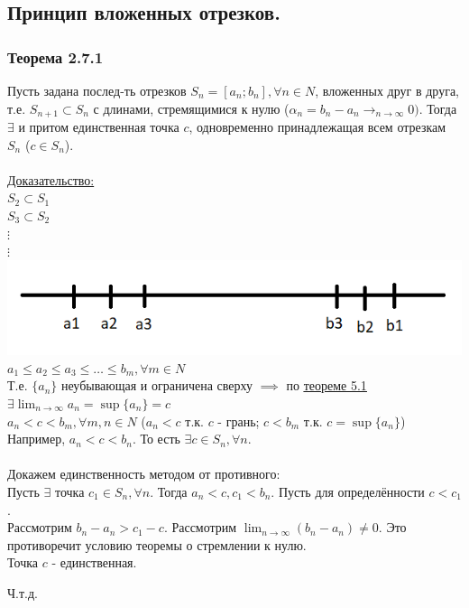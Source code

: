 \documentclass[12pt]{article}
\begin{document}
    \subsection{Принцип вложенных отрезков.}
    \subsubsection*{Теорема 2.7.1}\label{th:2.7.1}
    \indent Пусть задана послед-ть отрезков $S_{n} = [a_{n};b_{n}], \forall n \in N$, вложенных друг в друга, т.е. $S_{n+1} \subset S_{n}$ с длинами, стремящимися к нулю ($\alpha_{n} = b_{n} - a_{n} \rightarrow_{n\to\infty} 0)$. Тогда $\exists$ и притом единственная точка $c$, одновременно принадлежащая всем отрезкам $S_{n}$ ($c \in S_{n}$).\\\\
    \underline{Доказательство:}\\
    $S_{2} \subset S_{1}$\\
    $S_{3} \subset S_{2}$\\
    $\vdots$\\$\vdots$\\
    \includegraphics*{2.7.1}\\
    $a_{1} \le a_{2} \le a_{3} \le \dots \le b_{m}, \forall m \in N$\\
    Т.е. $\{a_{n}\}$ неубывающая и ограничена сверху $\implies$ по \underline{\hyperref[th:2.5.1]{теореме 5.1}} $\exists \lim_{n\to\infty}a_{n} = \sup\{a_{n}\} = c$\\
    $a_{n} < c < b_{m}, \forall m,n \in N$ ($a_{n} < c$ т.к. $c$ - грань; $c < b_{m}$ т.к. $c = \sup\{a_{n}\}$)\\
    Например, $a_{n} < c < b_{n}$. То есть $\exists c \in S_{n}, \forall n$.\\\\
    Докажем единственность методом от противного:\\
    Пусть $\exists$ точка $c_{1} \in S_{n}, \forall n$. Тогда $a_{n} < c, c_{1} < b_{n}$. Пусть для определённости $c < c_{1}$.\\
    Рассмотрим $b_{n} - a_{n} > c_{1} - c$. Рассмотрим $\lim_{n\to\infty}(b_{n} - a_{n}) \ne 0$. Это противоречит условию теоремы о стремлении к нулю.\\
    Точка $c$ - единственная.
    \begin{center}
        Ч.т.д.
    \end{center}
    
\end{document}
